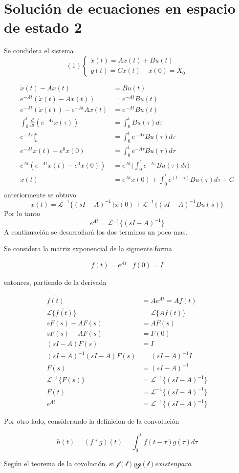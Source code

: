 \section{Solución de ecuaciones en espacio de estado 2}

Se condidera el sistema
\[
    (1)
    \left\{
        \begin{array}{lll}
            \dot{x}(t) = Ax(t) + Bu(t)\\
            y(t) = Cx(t) \;\;\;\;x(0)=X_{0}
        \end{array}
    \right.
\]

\[
    \begin{split}
        \dot{x}(t) -Ax(t) & = Bu(t)\\
        e^{-At} (\dot{x}(t)-Ax(t)) & = e^{-At}Bu(t)\\
        e^{-At} (\dot{x}(t)) - e^{-At}Ax(t) & = e^{-At}Bu(t)\\
        \int_{0}^{t} \frac{d}{dt} (e^{-A\tau}x(\tau)) & = \int_{0}^{t} Bu(\tau)d\tau\\
        e^{-A\tau}\Big|_a^b & = \int_{0}^{t} e^{-A\tau} Bu(\tau)d\tau\\
        e^{-At}x(t) - e^{0}x(0) & = \int_{0}^{t} e^{-A\tau} Bu(\tau)d\tau\\
        e^{At} (e^{-At}x(t) - e^{0}x(0)) & = e^{At} \Big(\int_{0}^{t} e^{-A\tau} Bu(\tau)d\tau\Big)\\
        x(t) & = e^{At}x(0) + \int_{0}^{t} e^{(t-\tau)}Bu(\tau)d\tau + C\\
    \end{split}
\]
anteriormente se obtuvo
\[
    x(t) = \mathcal{L}^{-1} \{ (sI-A)^{-1} \} x(0) + \mathcal{L}^{-1} \{ (sI-A)^{-1}Bu(s) \}
\]
Por lo tanto
\[
    e^{At} = \mathcal{L}^{-1} \{ (sI-A)^{-1} \}
\]
A continuación se desarrollará los dos terminos un poco mas.

Se considera la matriz exponencial de la siguiente forma 

\[
    \begin{matrix}
        f(t)=e^{At} & f(0)=I
    \end{matrix}
\]

entonces, partiendo de la derivada 

\[
    \begin{split}
        \dot{f(t)} & = Ae^{At} = Af(t)\\
        \mathcal{L} \{ \dot{f(t)} \} & = \mathcal{L} \{ Af(t) \}\\
        sF(s)-AF(s) & = AF(s)\\
        sF(s)-AF(s) & = F(0)\\
        (sI-A)F(s) & = I\\
        (sI-A)^{-1} (sI-A)F(s) & = (sI-A)^{-1}I\\
        F(s) & = (sI-A)^{-1}\\
        \mathcal{L}^{-1} \{ F(s) \} & = \mathcal{L}^{-1} \{ (sI-A)^{-1} \}\\
        F(t) & = \mathcal{L}^{-1} \{ (sI-A)^{-1} \}\\
        e^{At} & = \mathcal{L}^{-1} \{ (sI-A)^{-1} \}
    \end{split}
\]

Por otro lado, considerando la definicion de la convolución

\[
    h(t)=(f*g)(t) = \int_{0}^{t} f(t-\tau)g(\tau)d\tau 
\]

Según el teorema de la covolución. 
si \( \mathcal{f(t)} y \mathcal{g(t)} existen para \)
